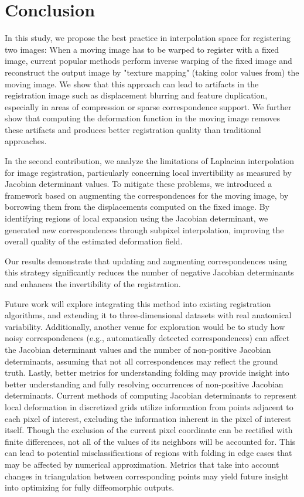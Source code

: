 \documentclass[lettersize,journal]{IEEEtran}
\begin{document}
\section{Conclusion}

In this study, we propose the best practice in interpolation space for registering two images: When a moving image has to be warped to register with a fixed image, current popular methods perform inverse warping of the fixed image and reconstruct the output image by "texture mapping" (taking color values from) the moving image. We show that this approach can lead to artifacts in the registration image such as displacement blurring and feature duplication, especially in areas of compression or sparse correspondence support. We further show that computing the deformation function in the moving image removes these artifacts and produces better registration quality than traditional approaches. 

In the second contribution, we analyze the limitations of Laplacian interpolation for image registration, particularly concerning local invertibility as measured by Jacobian determinant values. To mitigate these problems, we introduced a framework based on augmenting the correspondences for the moving image, by borrowing them from the displacements computed on the fixed image. By identifying regions of local expansion using the Jacobian determinant, we generated new correspondences through subpixel interpolation, improving the overall quality of the estimated deformation field.

Our results demonstrate that updating and augmenting correspondences using this strategy significantly reduces the number of negative Jacobian determinants and enhances the invertibility of the registration. 

Future work will explore integrating this method into existing registration algorithms, and extending it to three-dimensional datasets with real anatomical variability. Additionally, another venue for exploration would be to study how noisy correspondences (e.g., automatically detected correspondences) can affect the Jacobian determinant values and the number of non-positive Jacobian determinants, assuming that not all correspondences may reflect the ground truth. Lastly, better metrics for understanding folding may provide insight into better understanding and fully resolving occurrences of non-positive Jacobian determinants. Current methods of computing Jacobian determinants to represent local deformation in discretized grids utilize information from points adjacent to each pixel of interest, excluding the information inherent in the pixel of interest itself. Though the exclusion of the current pixel coordinate can be rectified with finite differences, not all of the values of its neighbors will be accounted for. This can lead to potential misclassifications of regions with folding in edge cases that may be affected by numerical approximation. Metrics that take into account changes in triangulation between corresponding points may yield future insight into optimizing for fully diffeomorphic outputs. 
\end{document}
